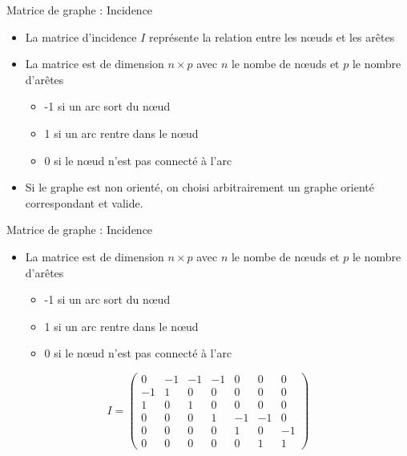 \begin{frame}{Matrice de graphe : Incidence}
    \begin{minipage}{0.49\linewidth}
        \begin{itemize}
            \item La \alert{matrice d'incidence} $I$ représente la relation entre les nœuds et les arêtes
            \item La matrice est de dimension $n \times p$ avec $n$ le nombe de nœuds et $p$ le nombre d'arêtes
            \begin{itemize}
                \item -1 si un arc sort du nœud
                \item 1 si un arc rentre dans le nœud
                \item 0 si le nœud n'est pas connecté à l'arc
            \end{itemize}
            \item Si le graphe est non orienté, on choisi arbitrairement un graphe orienté correspondant et valide.
        \end{itemize}
    \end{minipage}
    \begin{minipage}{0.49\linewidth}
    \end{minipage}
\end{frame}

\begin{frame}{Matrice de graphe : Incidence}
    \begin{minipage}{0.49\linewidth}
        \begin{itemize}
            \item La matrice est de dimension $n \times p$ avec $n$ le nombe de nœuds et $p$ le nombre d'arêtes
            \begin{itemize}
                \item -1 si un arc sort du nœud
                \item 1 si un arc rentre dans le nœud
                \item 0 si le nœud n'est pas connecté à l'arc
            \end{itemize}
        \end{itemize}
        \scriptsize{
        $$
        I = \begin{pmatrix}
            0 & -1 & -1 & -1 & 0 & 0 & 0\\
            -1 & 1 & 0 & 0 & 0 & 0 & 0\\
            1 & 0 & 1 & 0 & 0 & 0 & 0\\
            0 & 0 & 0 & 1 & -1 & -1 & 0\\
            0 & 0 & 0 & 0 & 1 & 0 & -1\\
            0 & 0 & 0 & 0 & 0 & 1 & 1
        \end{pmatrix}
        $$}
    \end{minipage}
    \begin{minipage}{0.49\linewidth}
    \end{minipage}
\end{frame}

